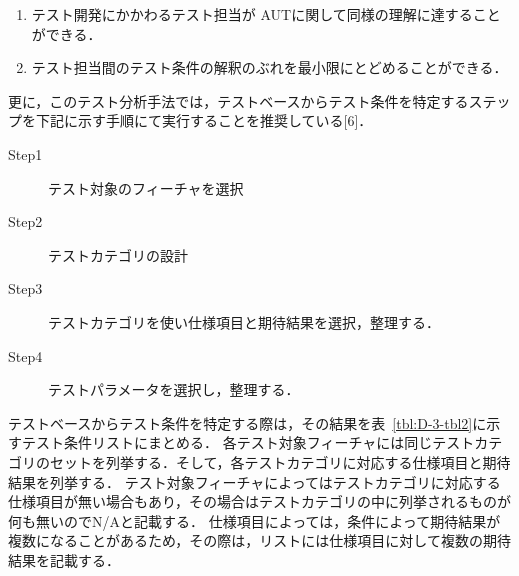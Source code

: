 \documentclass[a4paper,12pt]{jreport}
\begin{document}
\begin{enumerate}
\item テスト開発にかかわるテスト担当が AUTに関して同様の理解に達することができる．
\item テスト担当間のテスト条件の解釈のぶれを最小限にとどめることができる．
\end{enumerate}
更に，このテスト分析手法では，テストベースからテスト条件を特定するステップを下記に示す手順にて実行することを推奨している[6]．

\begin{description}
\item[Step1] テスト対象のフィーチャを選択
\item[Step2] テストカテゴリの設計
\item[Step3] テストカテゴリを使い仕様項目と期待結果を選択，整理する．
\item[Step4] テストパラメータを選択し，整理する．
\end{description}

テストベースからテスト条件を特定する際は，その結果を表~\ref{tbl:D-3-tbl2}に示すテスト条件リストにまとめる．
各テスト対象フィーチャには同じテストカテゴリのセットを列挙する．そして，各テストカテゴリに対応する仕様項目と期待結果を列挙する．
 テスト対象フィーチャによってはテストカテゴリに対応する仕様項目が無い場合もあり，その場合はテストカテゴリの中に列挙されるものが何も無いのでN/Aと記載する．
仕様項目によっては，条件によって期待結果が複数になることがあるため，その際は，リストには仕様項目に対して複数の期待結果を記載する．
\end{document}
